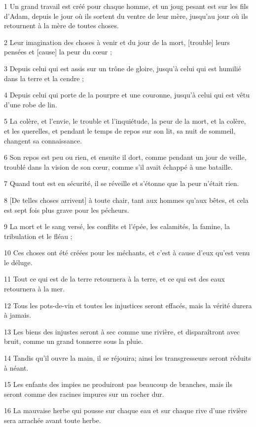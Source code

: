 \par 1 Un grand travail est créé pour chaque homme, et un joug pesant est sur les fils d'Adam, depuis le jour où ils sortent du ventre de leur mère, jusqu'au jour où ils retournent à la mère de toutes choses.
\par 2 Leur imagination des choses à venir et du jour de la mort, [trouble] leurs pensées et [cause] la peur du cœur ;
\par 3 Depuis celui qui est assis sur un trône de gloire, jusqu'à celui qui est humilié dans la terre et la cendre ;
\par 4 Depuis celui qui porte de la pourpre et une couronne, jusqu'à celui qui est vêtu d'une robe de lin.
\par 5 La colère, et l'envie, le trouble et l'inquiétude, la peur de la mort, et la colère, et les querelles, et pendant le temps de repos sur son lit, sa nuit de sommeil, changent sa connaissance.
\par 6 Son repos est peu ou rien, et ensuite il dort, comme pendant un jour de veille, troublé dans la vision de son cœur, comme s'il avait échappé à une bataille.
\par 7 Quand tout est en sécurité, il se réveille et s'étonne que la peur n'était rien.
\par 8 [De telles choses arrivent] à toute chair, tant aux hommes qu'aux bêtes, et cela est sept fois plus grave pour les pécheurs.
\par 9 La mort et le sang versé, les conflits et l'épée, les calamités, la famine, la tribulation et le fléau ;
\par 10 Ces choses ont été créées pour les méchants, et c'est à cause d'eux qu'est venu le déluge.
\par 11 Tout ce qui est de la terre retournera à la terre, et ce qui est des eaux retournera à la mer.
\par 12 Tous les pots-de-vin et toutes les injustices seront effacés, mais la vérité durera à jamais.
\par 13 Les biens des injustes seront à sec comme une rivière, et disparaîtront avec bruit, comme un grand tonnerre sous la pluie.
\par 14 Tandis qu'il ouvre la main, il se réjouira; ainsi les transgresseurs seront réduits à néant.
\par 15 Les enfants des impies ne produiront pas beaucoup de branches, mais ils seront comme des racines impures sur un rocher dur.
\par 16 La mauvaise herbe qui pousse sur chaque eau et sur chaque rive d'une rivière sera arrachée avant toute herbe.
